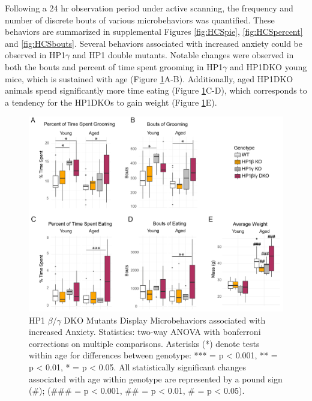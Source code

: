 \documentclass[onehalf,12pt]{beavtex}
\begin{document}
  Following a 24 hr observation period under active scanning, the
  frequency and number of discrete bouts of various microbehaviors was
  quantified. These behaviors are summarized in supplemental Figures
  \ref{fig:HCSpie}, \ref{fig:HCSpercent} and \ref{fig:HCSbouts}. Several
  behaviors associated with increased anxiety could be observed in
  HP1\(\gamma\) and HP1 double mutants. Notable changes were observed in
  both the bouts and percent of time spent grooming in HP1\(\gamma\) and
  HP1DKO young mice, which is sustained with age (Figure
  \ref{fig:GroomEatWeight}A-B). Additionally, aged HP1DKO animals spend
  significantly more time eating (Figure \ref{fig:GroomEatWeight}C-D),
  which corresponds to a tendency for the HP1DKOs to gain weight (Figure
  \ref{fig:GroomEatWeight}E).
  
  \begin{figure}
  
  {\centering \includegraphics[width=1\linewidth, ]{./figure/results/GroomEatWeight} 
  
  }
  
  \caption[HP1 $\beta$/$\gamma$ DKO Mutants Display Microbehaviors associated with increased Anxiety]{HP1 $\beta$/$\gamma$ DKO Mutants Display Microbehaviors associated with increased Anxiety. Statistics: two-way ANOVA with bonferroni corrections on multiple comparisons. Asterisks (*) denote tests within age for differences between genotype: *** = p < 0.001, ** = p < 0.01, * = p < 0.05. All statistically significant changes associated with age within genotype are represented by a pound sign (\#); (\#\#\# = p < 0.001, \#\# = p < 0.01, \# = p < 0.05).}\label{fig:GroomEatWeight}
  \end{figure}
  
\end{document}
